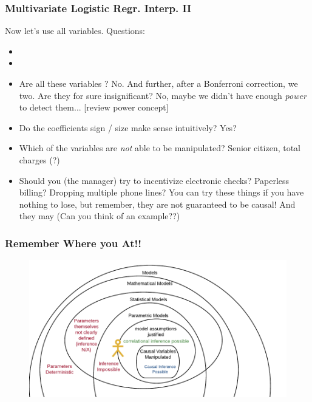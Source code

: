 \documentclass[handout]{beamer}
\begin{document}
\begin{frame}\frametitle{Multivariate Logistic Regr. Interp. II}

\small
Now let's use all variables. Questions:

\begin{itemize}
\item {}
\item {}
\item Are all these variables ? \pause No. And further, after a Bonferroni correction, we  two. Are they for sure insignificant? \pause No, maybe we didn't have enough \emph{power} to detect them... [review power concept]
\item Do the coefficients sign / size make sense intuitively? \pause Yes?
\item Which of the  variables are \textit{not} able to be manipulated? \pause Senior citizen, total charges (?) \pause
\item Should you (the manager) try to incentivize electronic checks? \pause Paperless billing? \pause Dropping multiple phone lines? \pause You can try these things if you have nothing to lose, but remember, they are not guaranteed to be causal! And they may  (Can you think of an example??)
\end{itemize}

\end{frame}

\begin{frame}\frametitle{Remember Where you At!!}

\begin{figure}
\centering
\includegraphics[width=4.75in]{where_we_at}
\end{figure}

	
\end{frame}
\end{document}
